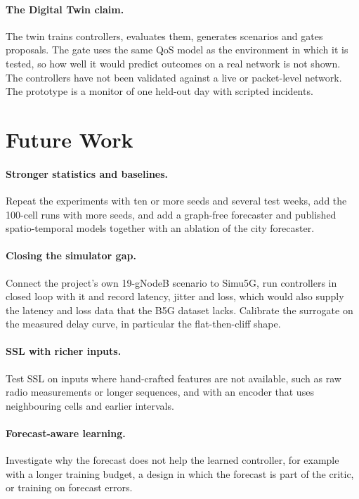 \paragraph{The Digital Twin claim.}
The twin trains controllers, evaluates them, generates scenarios and gates proposals. The gate uses the same QoS model as the environment in which it is tested, so how well it would predict outcomes on a real network is not shown. The controllers have not been validated against a live or packet-level network. The prototype is a monitor of one held-out day with scripted incidents.

\section{Future Work}
\label{sec:future-work}
\paragraph{Stronger statistics and baselines.}
Repeat the experiments with ten or more seeds and several test weeks, add the 100-cell runs with more seeds, and add a graph-free forecaster and published spatio-temporal models together with an ablation of the city forecaster.

\paragraph{Closing the simulator gap.}
Connect the project's own 19-gNodeB scenario to Simu5G, run controllers in closed loop with it and record latency, jitter and loss, which would also supply the latency and loss data that the B5G dataset lacks. Calibrate the surrogate on the measured delay curve, in particular the flat-then-cliff shape.

\paragraph{SSL with richer inputs.}
Test SSL on inputs where hand-crafted features are not available, such as raw radio measurements or longer sequences, and with an encoder that uses neighbouring cells and earlier intervals.

\paragraph{Forecast-aware learning.}
Investigate why the forecast does not help the learned controller, for example with a longer training budget, a design in which the forecast is part of the critic, or training on forecast errors.

